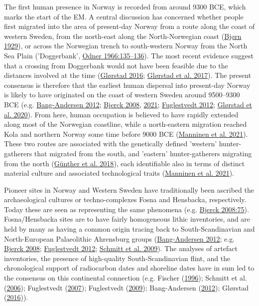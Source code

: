 \documentclass[
  a4paper,
  oneside]{uiophdthesis}
\begin{document}
The first human presence in Norway is recorded from around 9300 BCE, which marks the start of the EM. A central discussion has concerned whether people first migrated into the area of present-day Norway from a route along the coast of western Sweden, from the north-east along the North-Norwegian coast (\protect\hyperlink{ref-bjuxf8rn1929}{Bjørn 1929}), or across the Norwegian trench to south-western Norway from the North Sea Plain ('Doggerbank', \protect\hyperlink{ref-odner1966}{Odner 1966:135--136}). The most recent evidence suggest that a crossing from Doggerbank would not have been feasible due to the distances involved at the time (\protect\hyperlink{ref-glorstad2016}{Glørstad 2016}; \protect\hyperlink{ref-glorstad2017}{Glørstad et al. 2017}). The present consensus is therefore that the earliest human dispersal into present-day Norway is likely to have originated on the coast of western Sweden around 9500--9300 BCE (e.g. \protect\hyperlink{ref-bang-andersen2012}{Bang-Andersen 2012}; \protect\hyperlink{ref-bjerck2008}{Bjerck 2008}, \protect\hyperlink{ref-bjerck2021}{2021}; \protect\hyperlink{ref-fuglestvedt2012}{Fuglestvedt 2012}; \protect\hyperlink{ref-glorstad2020}{Glørstad et al. 2020}). From here, human occupation is believed to have rapidly extended along most of the Norwegian coastline, while a north-eastern migration reached Kola and northern Norway some time before 9000 BCE (\protect\hyperlink{ref-manninen2021}{Manninen et al. 2021}). These two routes are associated with the genetically defined 'western' hunter-gatherers that migrated from the south, and 'eastern' hunter-gatherers migrating from the north (\protect\hyperlink{ref-gunther2018}{Günther et al. 2018}), each identifiable also in terms of distinct material culture and associated technological traits (\protect\hyperlink{ref-manninen2021}{Manninen et al. 2021}).

Pioneer sites in Norway and Western Sweden have traditionally been ascribed the archaeological cultures or techno-complexes Fosna and Hensbacka, respectively. Today these are seen as representing the same phenomena (e.g. \protect\hyperlink{ref-bjerck2008}{Bjerck 2008:75}). Fosna/Hensbacka sites are to have fairly homogeneous lithic inventories, and are held by many as having a common origin tracing back to South-Scandinavian and North-European Palaeolithic Ahrensburg groups (\protect\hyperlink{ref-bang-andersen2012}{Bang-Andersen 2012}; e.g. \protect\hyperlink{ref-bjerck2008}{Bjerck 2008}; \protect\hyperlink{ref-fuglestvedt2012}{Fuglestvedt 2012}; \protect\hyperlink{ref-schmitt2009}{Schmitt et al. 2009}). The analyses of artefact inventories, the presence of high-quality South-Scandinavian flint, and the chronological support of radiocarbon dates and shoreline dates have in sum led to the consensus on this continental connection (e.g. Fischer (\protect\hyperlink{ref-fischer1996}{1996}); Schmitt et al. (\protect\hyperlink{ref-schmitt2006}{2006}); Fuglestvedt (\protect\hyperlink{ref-fuglestvedt2007}{2007}); Fuglestvedt (\protect\hyperlink{ref-fuglestvedt2009}{2009}); Bang-Andersen (\protect\hyperlink{ref-bang-andersen2012}{2012}); Glørstad (\protect\hyperlink{ref-glorstad2016}{2016})).
\end{document}
